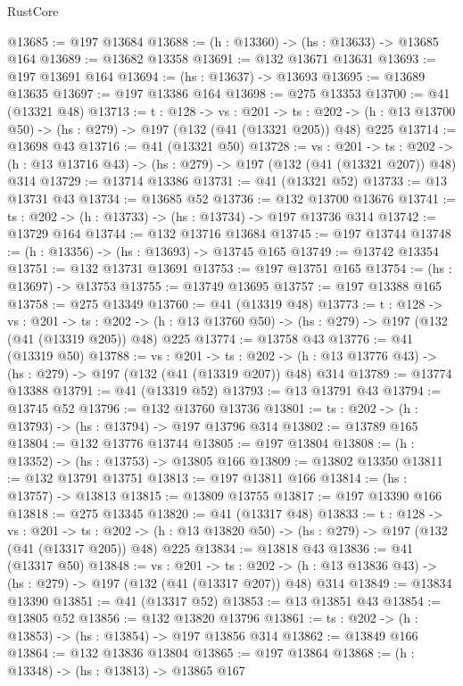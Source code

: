 \begin{lexlean}{RustCore}
\begin{coremodule}
@13685 := @197 @13684
@13688 := (h : @13360) -> (hs : @13633) -> @13685 @164
@13689 := @13682 @13358
@13691 := @132 @13671 @13631
@13693 := @197 @13691 @164
@13694 := (hs : @13637) -> @13693
@13695 := @13689 @13635
@13697 := @197 @13386 @164
@13698 := @275 @13353
@13700 := @41 (@13321 @48)
@13713 := {t : @128} ->
  {vs : @201} ->
  {ts : @202} -> (h : @13 @13700 @50) -> (hs : @279) -> @197 (@132 (@41 (@13321 @205)) @48) @225
@13714 := @13698 @43
@13716 := @41 (@13321 @50)
@13728 := {vs : @201} ->
  {ts : @202} -> (h : @13 @13716 @43) -> (hs : @279) -> @197 (@132 (@41 (@13321 @207)) @48) @314
@13729 := @13714 @13386
@13731 := @41 (@13321 @52)
@13733 := @13 @13731 @43
@13734 := @13685 @52
@13736 := @132 @13700 @13676
@13741 := {ts : @202} -> (h : @13733) -> (hs : @13734) -> @197 @13736 @314
@13742 := @13729 @164
@13744 := @132 @13716 @13684
@13745 := @197 @13744
@13748 := (h : @13356) -> (hs : @13693) -> @13745 @165
@13749 := @13742 @13354
@13751 := @132 @13731 @13691
@13753 := @197 @13751 @165
@13754 := (hs : @13697) -> @13753
@13755 := @13749 @13695
@13757 := @197 @13388 @165
@13758 := @275 @13349
@13760 := @41 (@13319 @48)
@13773 := {t : @128} ->
  {vs : @201} ->
  {ts : @202} -> (h : @13 @13760 @50) -> (hs : @279) -> @197 (@132 (@41 (@13319 @205)) @48) @225
@13774 := @13758 @43
@13776 := @41 (@13319 @50)
@13788 := {vs : @201} ->
  {ts : @202} -> (h : @13 @13776 @43) -> (hs : @279) -> @197 (@132 (@41 (@13319 @207)) @48) @314
@13789 := @13774 @13388
@13791 := @41 (@13319 @52)
@13793 := @13 @13791 @43
@13794 := @13745 @52
@13796 := @132 @13760 @13736
@13801 := {ts : @202} -> (h : @13793) -> (hs : @13794) -> @197 @13796 @314
@13802 := @13789 @165
@13804 := @132 @13776 @13744
@13805 := @197 @13804
@13808 := (h : @13352) -> (hs : @13753) -> @13805 @166
@13809 := @13802 @13350
@13811 := @132 @13791 @13751
@13813 := @197 @13811 @166
@13814 := (hs : @13757) -> @13813
@13815 := @13809 @13755
@13817 := @197 @13390 @166
@13818 := @275 @13345
@13820 := @41 (@13317 @48)
@13833 := {t : @128} ->
  {vs : @201} ->
  {ts : @202} -> (h : @13 @13820 @50) -> (hs : @279) -> @197 (@132 (@41 (@13317 @205)) @48) @225
@13834 := @13818 @43
@13836 := @41 (@13317 @50)
@13848 := {vs : @201} ->
  {ts : @202} -> (h : @13 @13836 @43) -> (hs : @279) -> @197 (@132 (@41 (@13317 @207)) @48) @314
@13849 := @13834 @13390
@13851 := @41 (@13317 @52)
@13853 := @13 @13851 @43
@13854 := @13805 @52
@13856 := @132 @13820 @13796
@13861 := {ts : @202} -> (h : @13853) -> (hs : @13854) -> @197 @13856 @314
@13862 := @13849 @166
@13864 := @132 @13836 @13804
@13865 := @197 @13864
@13868 := (h : @13348) -> (hs : @13813) -> @13865 @167

\end{coremodule}
\end{lexlean}
